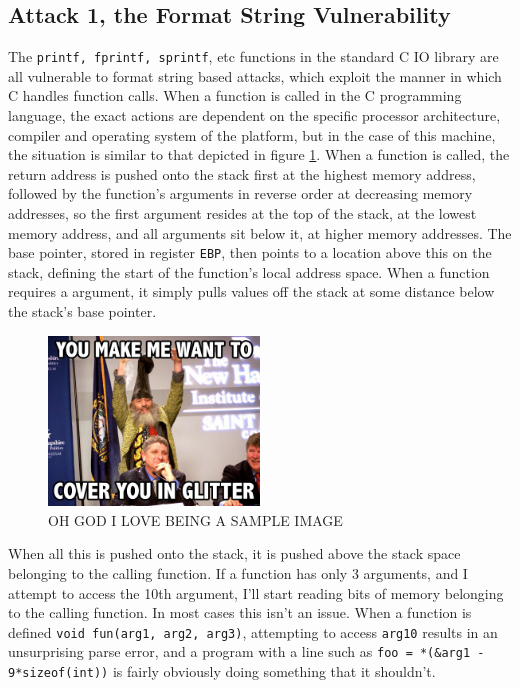 \subsection{Attack 1, the Format String Vulnerability}

The {\tt printf, fprintf, sprintf}, etc functions in the standard C IO library are all vulnerable to format string based attacks, which exploit the manner in which C handles function calls. When a function is called in the C programming language, 
the exact actions are dependent on the specific processor architecture, compiler and operating system of the platform, but in the case of this machine, the situation is similar to that depicted in figure \ref{fig_stack}. When a function is called, the return address is pushed onto the stack first at the highest memory address, followed by the function's arguments in reverse order at decreasing memory addresses, so the first argument resides at the top of the stack, at the lowest memory address, and all arguments sit below it, at higher memory addresses. The base pointer, stored in register {\tt EBP}, then points to a location above this on the stack, defining the start of the function's local address space. When a function requires a argument, it simply pulls values off the stack at some distance below the stack's base pointer.

\begin{figure}[h]
\centering
\includegraphics[width = 0.5\textwidth]{./images/placeholder.jpg}
\caption{OH GOD I LOVE BEING A SAMPLE IMAGE}
\label{fig_stack}
\end{figure}

When all this is pushed onto the stack, it is pushed above the stack space belonging to the calling function. If a function has only 3 arguments, and I attempt to access the 10th argument, I'll start reading bits of memory belonging to the calling function. In most cases this isn't an issue. When a function is defined {\tt void fun(arg1, arg2, arg3)}, attempting to access {\tt arg10} results in an unsurprising parse error, and a program with a line such as {\tt foo = *(\&arg1 - 9*sizeof(int))} is fairly obviously doing something that it shouldn't.

